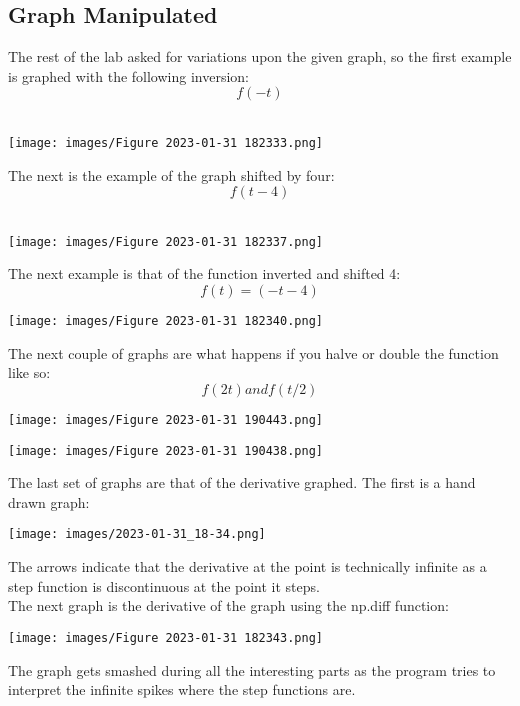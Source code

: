 \documentclass[12pt,a4paper]{article}
\begin{document}
\subsection{Graph Manipulated}
The rest of the lab asked for variations upon the given graph, so the first example is graphed with the following inversion: \\
$$f(-t)$$ \\

\begin{center}
\texttt{[image: images/Figure 2023-01-31 182333.png]}
\end{center}

The next is the example of the graph shifted by four:\\
$$f(t-4)$$\\
\begin{center}
\texttt{[image: images/Figure 2023-01-31 182337.png]}
\end{center}

The next example is that of the function inverted and shifted 4: \\
$$f(t)=(-t-4)$$

\begin{center}
\texttt{[image: images/Figure 2023-01-31 182340.png]}
\end{center}
The next couple of graphs are what happens if you halve or double the function like so: \\
$$f(2t) and f(t/2)$$
\begin{center}
\texttt{[image: images/Figure 2023-01-31 190443.png]}
\end{center}
\begin{center}
\texttt{[image: images/Figure 2023-01-31 190438.png]}
\end{center}
The last set of graphs are that of the derivative graphed. The first is a hand drawn graph: \\
\begin{center}
\texttt{[image: images/2023-01-31\_18-34.png]}
\end{center}

The arrows indicate that the derivative at the point is technically infinite as a step function is discontinuous at the point it steps. \\

The next graph is the derivative of the graph using the np.diff function: \\
\begin{center}
\texttt{[image: images/Figure 2023-01-31 182343.png]}
\end{center}
The graph gets smashed during all the interesting parts as the program tries to interpret the infinite spikes where the step functions are. 
\end{document}
